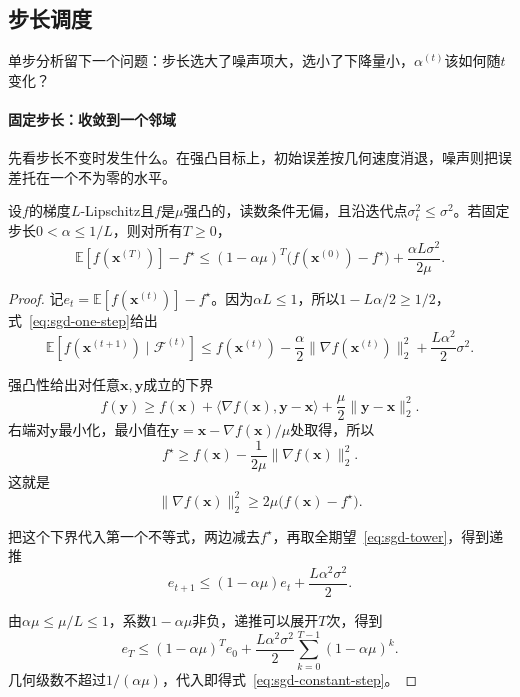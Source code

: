 \subsection{步长调度}
\label{sec:sgd-step-schedule}

单步分析留下一个问题：步长选大了噪声项大，选小了下降量小，$\alpha^{(t)}$该如何随$t$变化？

\paragraph{固定步长：收敛到一个邻域}
先看步长不变时发生什么。在强凸目标上，初始误差按几何速度消退，噪声则把误差托在一个不为零的水平。

\begin{theorem}[固定步长的误差邻域]
\label{thm:sgd-constant-step}
设$f$的梯度$L$-Lipschitz且$f$是$\mu$强凸的，读数条件无偏，且沿迭代点$\sigma_t^2\leq\sigma^2$。若固定步长$0<\alpha\leq1/L$，则对所有$T\geq0$，
\begin{equation}
 \mathbb{E}[f(\bm{x}^{(T)})]-f^\star\leq(1-\alpha\mu)^T\bigl(f(\bm{x}^{(0)})-f^\star\bigr)+\frac{\alpha L\sigma^2}{2\mu}.
 \label{eq:sgd-constant-step}
\end{equation}
\end{theorem}

\begin{proof}
记$e_t=\mathbb{E}[f(\bm{x}^{(t)})]-f^\star$。因为$\alpha L\leq1$，所以$1-L\alpha/2\geq1/2$，式~\eqref{eq:sgd-one-step}给出
\[
 \mathbb{E}[f(\bm{x}^{(t+1)})\mid\mathcal{F}^{(t)}]\leq f(\bm{x}^{(t)})-\frac{\alpha}{2}\lVert\nabla f(\bm{x}^{(t)})\rVert_2^2+\frac{L\alpha^2}{2}\sigma^2.
\]

强凸性给出对任意$\bm{x},\bm{y}$成立的下界
\[
 f(\bm{y})\geq f(\bm{x})+\langle\nabla f(\bm{x}),\bm{y}-\bm{x}\rangle+\frac{\mu}{2}\lVert\bm{y}-\bm{x}\rVert_2^2.
\]
右端对$\bm{y}$最小化，最小值在$\bm{y}=\bm{x}-\nabla f(\bm{x})/\mu$处取得，所以
\[
 f^\star\geq f(\bm{x})-\frac{1}{2\mu}\lVert\nabla f(\bm{x})\rVert_2^2.
\]
这就是
\[
 \lVert\nabla f(\bm{x})\rVert_2^2\geq2\mu\bigl(f(\bm{x})-f^\star\bigr).
\]

把这个下界代入第一个不等式，两边减去$f^\star$，再取全期望~\eqref{eq:sgd-tower}，得到递推
\[
 e_{t+1}\leq(1-\alpha\mu)e_t+\frac{L\alpha^2\sigma^2}{2}.
\]

由$\alpha\mu\leq\mu/L\leq1$，系数$1-\alpha\mu$非负，递推可以展开$T$次，得到
\[
 e_T\leq(1-\alpha\mu)^Te_0+\frac{L\alpha^2\sigma^2}{2}\sum_{k=0}^{T-1}(1-\alpha\mu)^k.
\]
几何级数不超过$1/(\alpha\mu)$，代入即得式~\eqref{eq:sgd-constant-step}。
\end{proof}


